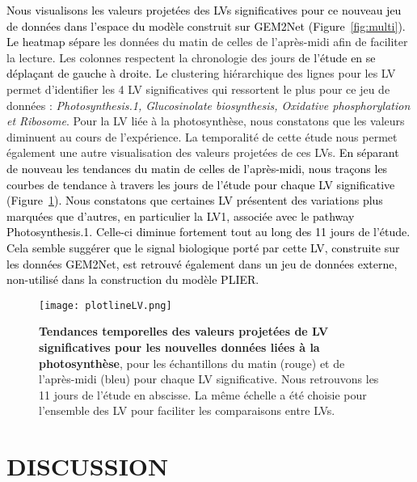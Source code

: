 \documentclass[twoside]{article}
\newcommand{\AR}[1]{\textcolor{black}{#1}}
\begin{document}
\vspace{0.5cm} \AR{Nous visualisons les valeurs projetées des LVs significatives pour ce nouveau jeu de données dans l'espace du modèle construit sur GEM2Net (Figure~\ref{fig:multi}). Le heatmap sépare} les données du matin de celles de l'après-midi afin de faciliter la lecture. Les colonnes respectent la chronologie des jours \AR{de l'étude en se déplaçant de gauche à droite.} Le clustering hiérarchique des lignes pour les LV permet d'identifier les 4 LV significatives qui ressortent le plus pour ce jeu de données : \textit{Photosynthesis.1, Glucosinolate biosynthesis, Oxidative phosphorylation et Ribosome}. Pour la LV liée à la photosynthèse, nous constatons que les valeurs diminuent au cours de l'expérience. La temporalité de cette étude nous permet également une autre visualisation des valeurs projetées de ces LVs. \AR{En séparant de nouveau les tendances du matin de celles de l'après-midi, nous traçons les courbes de tendance à travers les jours de l'étude pour chaque LV significative (Figure~\ref{fig:lines}). Nous constatons que certaines LV présentent des variations plus marquées que d'autres, en particulier la LV1, associée avec le pathway Photosynthesis.1. Celle-ci diminue fortement tout au long des 11 jours de l'étude. Cela semble suggérer que le signal biologique porté par cette LV, construite sur les données GEM2Net, est retrouvé également dans un jeu de données externe, non-utilisé dans la construction du modèle PLIER.}


    \begin{figure}[!h]
    \centering
        \texttt{[image: plotlineLV.png]}
        \caption[Tendances temporelles des valeurs projetées de LV significatives pour les nouvelles données liées à la  photosynthèse]{\textbf{Tendances temporelles des valeurs projetées de LV significatives pour les nouvelles données liées à la photosynthèse}, pour les échantillons du matin (rouge) et de l'après-midi (bleu) pour chaque LV significative. Nous retrouvons les 11 jours de l'étude en abscisse. La même échelle a été choisie pour l'ensemble des LV pour faciliter les comparaisons entre LVs.\label{fig:lines}}
    \end{figure}
    
\clearpage

\section{\textbf{DISCUSSION}}
\end{document}
